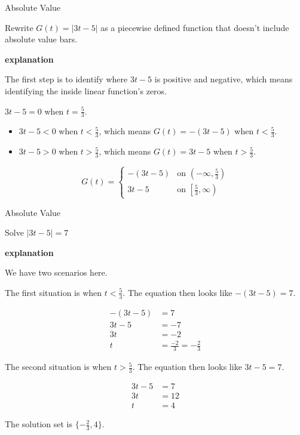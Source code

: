 \documentclass{ximera}
\begin{document}
\begin{example} Absolute Value


Rewrite $G(t) = | 3t - 5 |$ as a piecewise defined function that doesn't include absolute value bars.


\textbf{\textcolor{red!75!green}{explanation}} 

The first step is to identify where $3t - 5$ is positive and negative, which means identifying the inside linear function's zeros.



$3t-5=0$ when $t=\frac{5}{3}$.


\begin{itemize}
\item $3t - 5 < 0$ when $t<\tfrac{5}{3}$, which means $G(t) = -(3t - 5)$ when $t<\tfrac{5}{3}$.
\item $3t - 5 > 0$ when $t>\tfrac{5}{3}$, which means $G(t) = 3t - 5$ when $t>\tfrac{5}{3}$.
\end{itemize}





\[
G(t) = 
\begin{cases}
  -(3t-5) &\text{on $\left( -\infty, \tfrac{5}{3} \right)$} \\
  3t-5 &\text{on $\left[ \tfrac{5}{3}, \infty \right)$}
\end{cases}
\]






\end{example}







\begin{example} Absolute Value


Solve $| 3t - 5 | = 7$

\textbf{\textcolor{red!75!green}{explanation}} 


We have two scenarios here.

The first situation is when $t < \frac{5}{3}$.  The equation then looks like $-(3t - 5) = 7$.

\begin{align*}
-(3t - 5) & = 7 \\
3t - 5 & = -7  \\
3t & = -2  \\
t & = \frac{-2}{3} = -\frac{2}{3}
\end{align*}



The second situation is when $t > \frac{5}{3}$.  The equation then looks like $3t - 5 = 7$.

\begin{align*}
3t - 5 & = 7 \\
3t  & = 12  \\
t & = 4
\end{align*}


The solution set is $\{  -\frac{2}{3}, 4 \}$.



\end{example}
\end{document}
